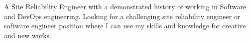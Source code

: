 A Site Reliability Engineer with a demonstrated history of working in Software and DevOps engineering.
Looking for a challenging site reliability engineer or software engineer position where I can use my skills and knowledge for creative and new works.

